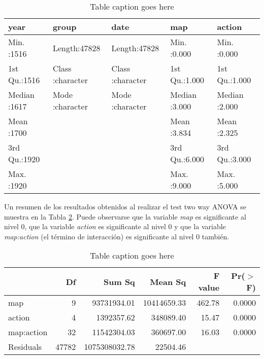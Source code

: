 \documentclass[10pt,a4paper]{article}
\begin{document}
\begin{table}[ht]
\centering
\begin{tabular}{lllll}
  \hline
     year &    group &     date &      map &     action \\ 
  \hline
Min.   :1516   & Length:47828       & Length:47828       & Min.   :0.000   & Min.   :0.000   \\ 
  1st Qu.:1516   & Class :character   & Class :character   & 1st Qu.:1.000   & 1st Qu.:1.000   \\ 
  Median :1617   & Mode  :character   & Mode  :character   & Median :3.000   & Median :2.000   \\ 
  Mean   :1700   &  &  & Mean   :3.834   & Mean   :2.325   \\ 
  3rd Qu.:1920   &  &  & 3rd Qu.:6.000   & 3rd Qu.:3.000   \\ 
  Max.   :1920   &  &  & Max.   :9.000   & Max.   :5.000   \\ 
   \hline
\end{tabular}
\caption{Table caption goes here}
\label{table:2}
\end{table}

Un resumen de los resultados obtenidos al realizar el test two way ANOVA se muestra en la Tabla \ref{table:3}. Puede observarse que la variable \emph{map} es significante al nivel $0$, que la variable \emph{action} es significante al nivel $0$ y que la variable \emph{map:action} (el término de interacción) es significante al nivel $0$ también.

\begin{table}[ht]
\centering
\begin{tabular}{lrrrrr}
  \hline
 & Df & Sum Sq & Mean Sq & F value & Pr($>$F) \\ 
  \hline
map         & 9 & 93731934.01 & 10414659.33 & 462.78 & 0.0000 \\ %
  action      & 4 & 1392357.62 & 348089.40 & 15.47 & 0.0000 \\ %
  map:action  & 32 & 11542304.03 & 360697.00 & 16.03 & 0.0000 \\ %
  Residuals   & 47782 & 1075308032.78 & 22504.46 &  &  \\ 
   \hline
\end{tabular}
\caption{Table caption goes here}
\label{table:3}
\end{table}
\end{document}
